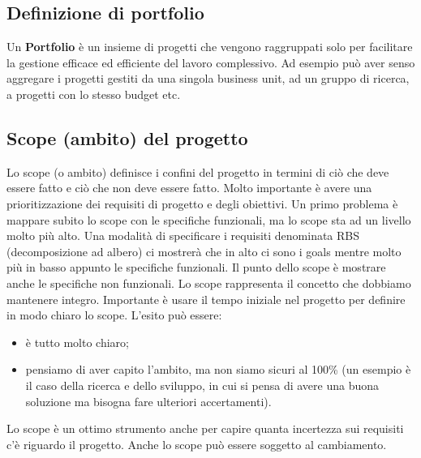 \subsection{Definizione di portfolio}
Un \textbf{Portfolio} è un insieme di progetti che vengono raggruppati solo per facilitare la gestione efficace ed efficiente del lavoro complessivo. Ad esempio può aver senso aggregare i progetti gestiti da una singola business unit, ad un gruppo di ricerca, a progetti con lo stesso budget etc.\newline
{}
\subsection{Scope (ambito) del progetto}
Lo scope (o ambito) definisce i confini del progetto in termini di ciò che deve essere fatto e ciò che non deve essere fatto.\newline
Molto importante è avere una prioritizzazione dei requisiti di progetto e degli obiettivi.\newline
Un primo problema è mappare subito lo scope con le specifiche funzionali, ma lo scope sta ad un livello molto più alto. Una modalità di specificare i requisiti denominata RBS (decomposizione ad albero) ci mostrerà che in alto ci sono i goals mentre molto più in basso appunto le specifiche funzionali. Il punto dello scope è mostrare anche le specifiche non funzionali.\newline
Lo scope rappresenta il concetto che dobbiamo mantenere integro. Importante è usare il tempo iniziale nel progetto per definire in modo chiaro lo scope. L'esito può essere:
\begin{itemize}
	\item è tutto molto chiaro;
	\item pensiamo di aver capito l'ambito, ma non siamo sicuri al 100\% (un esempio è il caso della ricerca e dello sviluppo, in cui si pensa di avere una buona soluzione ma bisogna fare ulteriori accertamenti).
\end{itemize}
Lo scope è un ottimo strumento anche per capire quanta incertezza sui requisiti c'è riguardo il progetto.\newline
Anche lo scope può essere soggetto al cambiamento.
